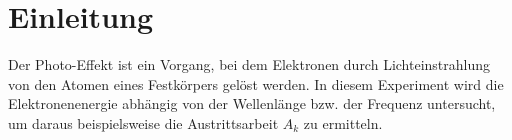 \section{Einleitung}
Der Photo-Effekt ist ein Vorgang,  bei dem Elektronen durch Lichteinstrahlung von den Atomen eines Festkörpers gelöst werden.
In diesem Experiment wird die Elektronenenergie abhängig von der Wellenlänge bzw. der Frequenz untersucht,
um daraus beispielsweise die Austrittsarbeit $A_k$ zu ermitteln.
\label{sec:Einleitung}